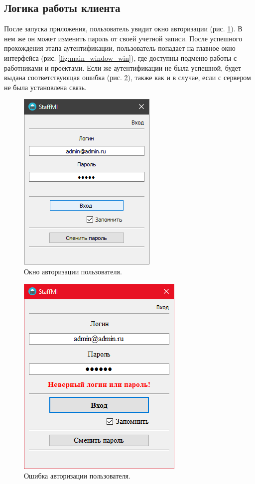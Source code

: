 \subsection{Логика работы клиента}
После запуска приложения, пользователь увидит окно авторизации (рис. \ref{fig:auth_window_win}).
В нем же он может изменить пароль от своей учетной записи. После успешного прохождения этапа аутентификации,
пользователь попадает на главное окно интерфейса (рис. \ref{fig:main_window_win}), где доступны подменю работы с работниками и проектами.
Если же аутентификации не была успешной, будет выдана соответствующая ошибка (рис. \ref{fig:auth_login_error}), также как и в случае, если с сервером не была установлена связь.
\begin{figure}[h]
    \centering
    \includegraphics[width=0.4\linewidth]{img/auth_window_win.png}
    \caption{Окно авторизации пользователя.}
    \label{fig:auth_window_win}
\end{figure}
\begin{figure}[h]
    \centering
    \includegraphics[width=0.4\linewidth]{img/login_error.png}
    \caption{Ошибка авторизации пользователя.}
    \label{fig:auth_login_error}
\end{figure}

